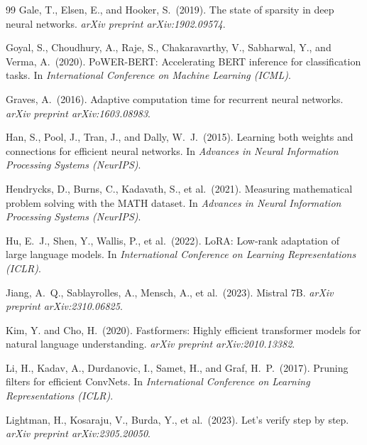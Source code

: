 \documentclass{article}
\begin{document}
\begin{thebibliography}{99}
Gale, T., Elsen, E., and Hooker, S.\ (2019).
\newblock The state of sparsity in deep neural networks.
\newblock \emph{arXiv preprint arXiv:1902.09574}.

Goyal, S., Choudhury, A., Raje, S., Chakaravarthy, V., Sabharwal, Y., and Verma, A.\ (2020).
\newblock PoWER-BERT: Accelerating BERT inference for classification tasks.
\newblock In \emph{International Conference on Machine Learning (ICML)}.

Graves, A.\ (2016).
\newblock Adaptive computation time for recurrent neural networks.
\newblock \emph{arXiv preprint arXiv:1603.08983}.

Han, S., Pool, J., Tran, J., and Dally, W.~J.\ (2015).
\newblock Learning both weights and connections for efficient neural networks.
\newblock In \emph{Advances in Neural Information Processing Systems (NeurIPS)}.

Hendrycks, D., Burns, C., Kadavath, S., et al.\ (2021).
\newblock Measuring mathematical problem solving with the MATH dataset.
\newblock In \emph{Advances in Neural Information Processing Systems (NeurIPS)}.

Hu, E.~J., Shen, Y., Wallis, P., et al.\ (2022).
\newblock LoRA: Low-rank adaptation of large language models.
\newblock In \emph{International Conference on Learning Representations (ICLR)}.

Jiang, A.~Q., Sablayrolles, A., Mensch, A., et al.\ (2023).
\newblock Mistral 7B.
\newblock \emph{arXiv preprint arXiv:2310.06825}.

Kim, Y. and Cho, H.\ (2020).
\newblock Fastformers: Highly efficient transformer models for natural language understanding.
\newblock \emph{arXiv preprint arXiv:2010.13382}.

Li, H., Kadav, A., Durdanovic, I., Samet, H., and Graf, H.~P.\ (2017).
\newblock Pruning filters for efficient ConvNets.
\newblock In \emph{International Conference on Learning Representations (ICLR)}.

Lightman, H., Kosaraju, V., Burda, Y., et al.\ (2023).
\newblock Let's verify step by step.
\newblock \emph{arXiv preprint arXiv:2305.20050}.


\end{thebibliography}
\end{document}
